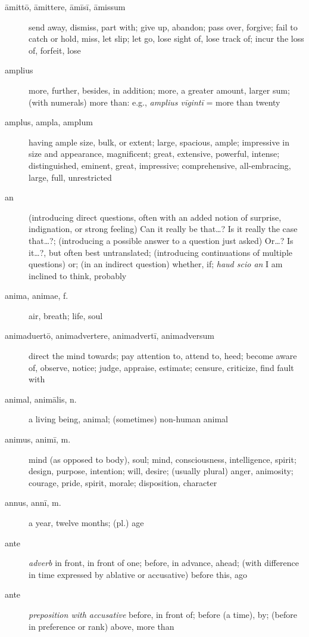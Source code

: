 \begin{description}
    \item[āmittō, āmittere, āmīsī, āmissum] \marginnote{*}send away, dismiss, part with; give up, abandon; pass over, forgive; fail to catch or hold, miss, let slip; let go, lose sight of, lose track of; incur the loss of, forfeit, lose
    \item[amplius] more, further, besides, in addition; more, a greater amount, larger sum; (with numerals) more than: e.g., \textit{amplius vīgintī} = more than twenty
    \item[amplus, ampla, amplum] \marginnote{*}having ample size, bulk, or extent; large, spacious, ample; impressive in size and appearance, magnificent; great, extensive, powerful, intense; distinguished, eminent, great, impressive; comprehensive, all-embracing, large, full, unrestricted
    \item[an] \marginnote{*}(introducing direct questions, often with an added notion of surprise, indignation, or strong feeling) Can it really be that\dots ? Is it really the case that\dots ?; (introducing a possible answer to a question just asked) Or\dots? Is it\dots?, but often best untranslated; (introducing continuations of multiple questions) or; (in an indirect question) whether, if; \textit{haud scio an} I am inclined to think, probably
    \item[anima, animae, f.] \marginnote{*}air, breath; life, soul
    \item[animaduertō, animadvertere, animadvertī, animadversum] \marginnote{*}direct the mind towards; pay attention to, attend to, heed; become aware of, observe, notice; judge, appraise, estimate; censure, criticize, find fault with
    \item[animal, animālis, n.] \marginnote{*}a living being, animal; (sometimes) non-human animal
    \item[animus, animī, m.] \marginnote{*}mind (as opposed to body), soul; mind, consciousness, intelligence, spirit; design, purpose, intention; will, desire; (usually plural) anger, animosity; courage, pride, spirit, morale; disposition, character
    \item[annus, annī, m.] \marginnote{*}a year, twelve months; (pl.) age
    \item[ante] \marginnote{*}\textit{adverb} in front, in front of one; before, in advance, ahead; (with difference in time expressed by ablative or accusative) before this, ago
    \item[ante] \marginnote{*}\textit{preposition with accusative} before, in front of; before (a time), by; (before in preference or rank) above, more than

\end{description}
